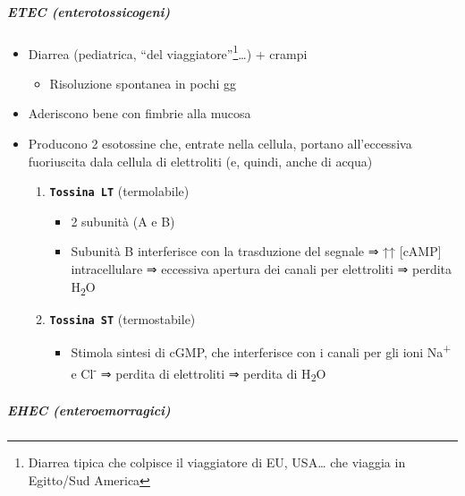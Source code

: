 \documentclass[italian,]{article}
\providecommand{\tightlist}{%
  \setlength{\itemsep}{0pt}\setlength{\parskip}{0pt}}
\begin{document}
\hypertarget{etec-enterotossicogeni}{%
\subparagraph{ETEC (enterotossicogeni)}\label{etec-enterotossicogeni}}

\begin{itemize}
\tightlist
\item
  Diarrea (pediatrica, ``del viaggiatore''\footnote{Diarrea tipica che
    colpisce il viaggiatore di EU, USA\ldots{} che viaggia in Egitto/Sud
    America}\ldots{}) + crampi

  \begin{itemize}
  \tightlist
  \item
    Risoluzione spontanea in pochi gg
  \end{itemize}
\item
  Aderiscono bene con fimbrie alla mucosa
\item
  Producono 2 esotossine che, entrate nella cellula, portano
  all'eccessiva fuoriuscita dala cellula di elettroliti (e, quindi,
  anche di acqua)

  \begin{enumerate}
  \def\labelenumi{\arabic{enumi}.}
  \tightlist
  \item
    \textbf{\texttt{Tossina\ LT}} (termolabile)

    \begin{itemize}
    \tightlist
    \item
      2 subunità (A e B)
    \item
      Subunità B interferisce con la trasduzione del segnale ⇒ ↑↑
      {[}cAMP{]} intracellulare ⇒ eccessiva apertura dei canali per
      elettroliti ⇒ perdita H\textsubscript{2}O
    \end{itemize}
  \item
    \textbf{\texttt{Tossina\ ST}} (termostabile)

    \begin{itemize}
    \tightlist
    \item
      Stimola sintesi di cGMP, che interferisce con i canali per gli
      ioni Na\textsuperscript{+} e Cl\textsuperscript{-} ⇒ perdita di
      elettroliti ⇒ perdita di H\textsubscript{2}O
    \end{itemize}
  \end{enumerate}
\end{itemize}

\hypertarget{ehec-enteroemorragici}{%
\subparagraph{EHEC (enteroemorragici)}\label{ehec-enteroemorragici}}
\end{document}
